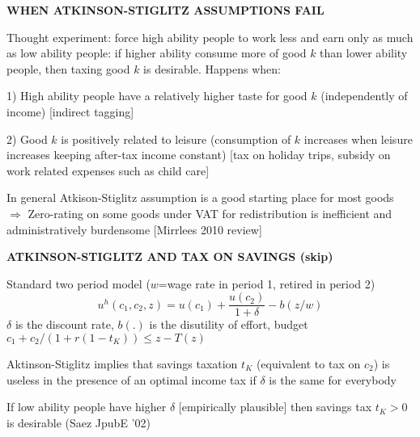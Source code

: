 \documentclass[landscape]{slides}
\begin{document}
\begin{slide}
\begin{center}
{\bf WHEN ATKINSON-STIGLITZ ASSUMPTIONS FAIL}
\end{center}

Thought experiment: force high ability people to work less and
earn only as much as low ability people: if higher ability consume
more of good $k$ than lower ability people, then taxing good $k$
is desirable. Happens when:

1) High ability people have a relatively higher taste for good $k$
(independently of income) [indirect tagging]

2) Good $k$ is positively related to leisure (consumption of $k$
increases when leisure increases keeping after-tax income
constant) [tax on holiday trips, subsidy on work
related expenses such as child care]

In general Atkison-Stiglitz assumption is a good starting place
for most goods $\Rightarrow$ Zero-rating on some goods under VAT
for redistribution is inefficient and administratively burdensome
[Mirrlees 2010 review]

\end{slide}

\begin{slide}
\begin{center}
{\bf ATKINSON-STIGLITZ AND TAX ON SAVINGS (skip)}
\end{center}
Standard two period model ($w$=wage rate in period 1, retired in
period 2)
$$u^h(c_1,c_2,z)=u(c_1)+\frac{u(c_2)}{1+\delta}-b(z/w)$$
$\delta$ is the discount rate, $b(.)$ is the disutility of effort,
budget $c_1+c_2/(1+r(1-t_K)) \leq z-T(z)$

Aktinson-Stiglitz implies that savings taxation $t_K$ (equivalent
to tax on $c_2$) is useless in the presence of an optimal income
tax if $\delta$ is the same for everybody

If low ability people have higher $\delta$ [empirically plausible]
then savings tax $t_K>0$ is desirable (Saez JpubE '02)

\end{slide}

%
%
%
%
%
\end{document}
